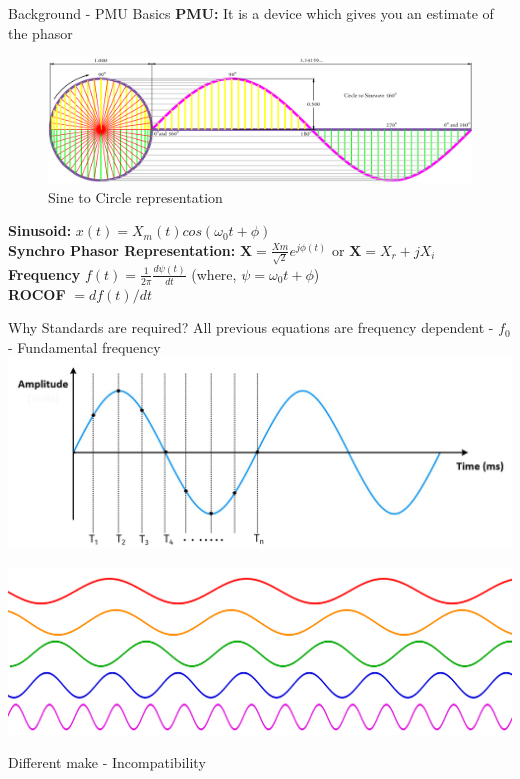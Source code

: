 \documentclass{beamer}
\begin{document}
   \begin{frame}{Background - PMU Basics}
   \textbf{PMU:} It is a device which gives you an estimate of the phasor 
   \begin{figure}
   \includegraphics*[scale = 0.2]{Circle-To-Sine-Wave.png}
   \caption{Sine to Circle representation \cite{site:westau}}
   \end{figure}

   \textbf{Sinusoid:} \textbf{$x(t) = X_m(t) cos(\omega_{0} t + \phi)$} \\
	\textbf{Synchro Phasor Representation:} $\textbf{X} = \frac{Xm}{\sqrt{2}}e^{j\phi(t)} $ or $\textbf{X} = X_r+jX_i$ \\
	\textbf{Frequency} $f(t) = \frac{1}{2\pi}\frac{d\psi(t)}{dt}$ {\small(where, $ \psi = \omega_{0} t + \phi$) }\\
	\textbf{ROCOF} $= df(t)/dt$
   
   \end{frame}

\begin{frame}{Why Standards are required?}
\centering
All previous equations are frequency dependent - $f_0$ - Fundamental frequency
\includegraphics[scale=0.2]{sine_sampled.png} \\
\pause

\includegraphics[scale=0.1]{multisine.png}

\pause

\hspace{50pt}Different make - Incompatibility 
\end{frame}
   
\end{document}
